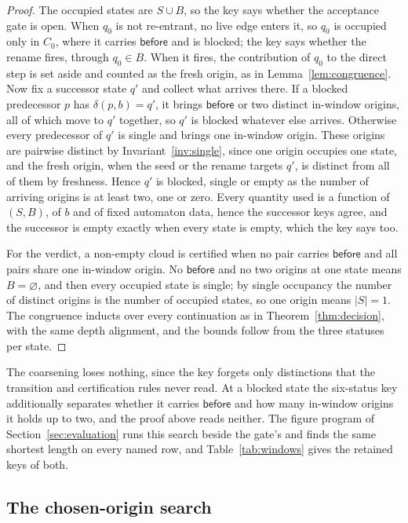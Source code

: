\documentclass[11pt,a4paper]{article}
\theoremstyle{definition}
\theoremstyle{plain}
\newcommand{\before}{\mathsf{before}}
\begin{document}
\begin{proof}
The occupied states are $S \cup B$, so the key says whether the acceptance gate is open. When $q_0$ is not re-entrant,
no live edge enters it, so $q_0$ is occupied only in $C_0$, where it carries $\before$ and is blocked; the key says
whether the rename fires, through $q_0 \in B$. When it fires, the contribution of $q_0$ to the direct step is set aside
and counted as the fresh origin, as in Lemma~\ref{lem:congruence}. Now fix a successor state $q'$ and collect what
arrives there. If a blocked predecessor $p$ has $\delta(p, b) = q'$, it brings $\before$ or two distinct in-window
origins, all of which move to $q'$ together, so $q'$ is blocked whatever else arrives. Otherwise every predecessor of
$q'$ is single and brings one in-window origin. These origins are pairwise distinct by Invariant~\ref{inv:single}, since
one origin occupies one state, and the fresh origin, when the seed or the rename targets $q'$, is distinct from all of
them by freshness. Hence $q'$ is blocked, single or empty as the number of arriving origins is at least two, one or
zero. Every quantity used is a function of $(S, B)$, of $b$ and of fixed automaton data, hence the successor keys agree,
and the successor is empty exactly when every state is empty, which the key says too.

For the verdict, a non-empty cloud is certified when no pair carries $\before$ and all pairs share one in-window origin.
No $\before$ and no two origins at one state means $B = \varnothing$, and then every occupied state is single; by single
occupancy the number of distinct origins is the number of occupied states, so one origin means $|S| = 1$. The congruence
inducts over every continuation as in Theorem~\ref{thm:decision}, with the same depth alignment, and the bounds follow
from the three statuses per state.
\end{proof}

The coarsening loses nothing, since the key forgets only distinctions that the transition and certification rules never
read. At a blocked state the six-status key additionally separates whether it carries $\before$ and how many in-window
origins it holds up to two, and the proof above reads neither. The figure program of Section~\ref{sec:evaluation} runs
this search beside the gate's and finds the same shortest length on every named row, and Table~\ref{tab:windows} gives
the retained keys of both.

\subsection{The chosen-origin search}
\label{sec:chosen}
\end{document}
